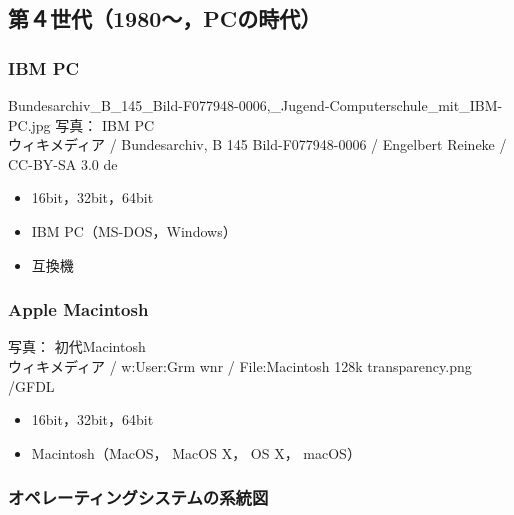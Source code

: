 \documentclass[unicode]{beamer}                   %
\begin{document}
\subsection{第４世代（1980〜，PCの時代）}
\begin{frame}
  \frametitle{IBM PC}
{Bundesarchiv_B_145_Bild-F077948-0006,_Jugend-Computerschule_mit_IBM-PC.jpg}
      {\tiny
          写真： IBM PC \\
          ウィキメディア /
          Bundesarchiv, B 145 Bild-F077948-0006 /
          Engelbert Reineke / CC-BY-SA 3.0 de
      }
  \begin{itemize}
    \item 16bit，32bit，64bit
    \item IBM PC（MS-DOS，Windows）
    \item 互換機
  \end{itemize}
\end{frame}

\begin{frame}
  \frametitle{Apple Macintosh}
      {\tiny
          写真： 初代Macintosh \\
          ウィキメディア / w:User:Grm wnr / 
          File:Macintosh 128k transparency.png /GFDL
      }
  \begin{itemize}
    \item 16bit，32bit，64bit
    \item Macintosh（MacOS， MacOS X， OS X， macOS）
  \end{itemize}
\end{frame}

\begin{frame}
  \frametitle{オペレーティングシステムの系統図}
\end{frame}
\end{document}
